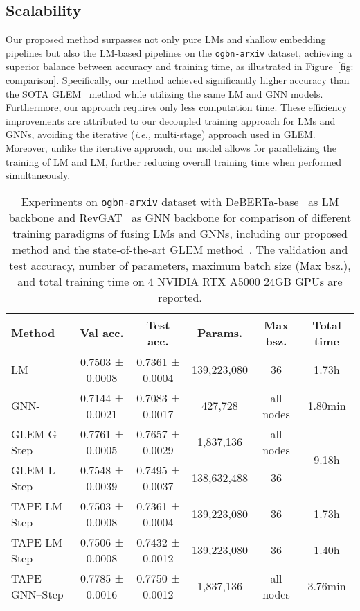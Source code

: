 \documentclass{article}
\newcommand{\ie}{\emph{i.e.,}\xspace}
\begin{document}
\subsection{Scalability}

Our proposed method surpasses not only pure LMs and shallow embedding pipelines but also the LM-based pipelines on the \texttt{ogbn-arxiv} dataset, achieving a superior balance between accuracy and training time, as illustrated in Figure~\ref{fig: comparison}. Specifically, our method achieved significantly higher accuracy than the SOTA GLEM~\citep{zhao2022learning_em} method while utilizing the same LM and GNN models. Furthermore, our approach requires only  less computation time. These efficiency improvements are attributed to our decoupled training approach for LMs and GNNs, avoiding the iterative (\ie multi-stage) approach used in GLEM. Moreover, unlike the iterative approach, our model allows for parallelizing the training of LM and LM, further reducing overall training time when performed simultaneously. 

\begin{table}[t]
\caption{Experiments on \texttt{ogbn-arxiv} dataset with DeBERTa-base~\citep{he2021deberta} as LM backbone and RevGAT~\citep{li2021training_revgat} as GNN backbone for comparison of different training paradigms of fusing LMs and GNNs, including our proposed method and the state-of-the-art GLEM method~\citep{zhao2022learning_em}.  The validation and test accuracy, number of parameters, maximum batch size (Max bsz.), and total training time on 4 NVIDIA RTX A5000 24GB GPUs are reported. 
}
\label{tab: comparison}
\small
    \centering
    \begin{tabular}{lccccc}
    \toprule
    Method
    &  Val acc. &  Test acc. & Params. & Max bsz. & Total time \\
    \midrule
    LM
    & 0.7503 ± 0.0008
    & 0.7361 ± 0.0004
    & 139,223,080
    & 36
    & 1.73h \\
    \midrule
    GNN-
    & 0.7144 ± 0.0021
    & 0.7083 ± 0.0017
    & 427,728
    & all nodes
    & 1.80min \\
    \midrule
    GLEM-G-Step
    & 0.7761 ± 0.0005
    & 0.7657 ± 0.0029
    & 1,837,136
    & all nodes
    & \multirow{2}{*}{9.18h} \\
    GLEM-L-Step
    & 0.7548 ± 0.0039
    & 0.7495 ± 0.0037
    & 138,632,488
    & 36
    &\\
    \midrule
    TAPE-LM-Step
    & 0.7503 ± 0.0008
    & 0.7361 ± 0.0004
    & 139,223,080
    & 36
    & 1.73h\\
    TAPE-LM-Step
    & 0.7506 ± 0.0008
    & 0.7432 ± 0.0012
    & 139,223,080
    & 36
    & 1.40h\\
    TAPE-GNN--Step
    & {0.7785 ± 0.0016}
    & 0.7750 ± 0.0012
    & 1,837,136
    & all nodes
    & 3.76min
    \\
    \bottomrule
    \end{tabular}
\end{table}
\end{document}
